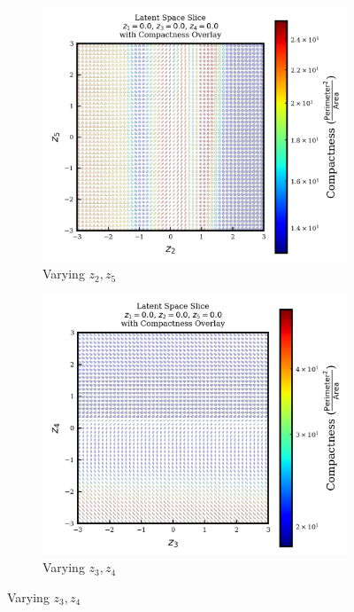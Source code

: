 \documentclass{article}
\begin{document}
\begin{figure}[H]
    \vspace{0.5em} %
    
    \begin{subfigure}{0.45\textwidth}
        \includegraphics[width=\linewidth]{figures/VAEmodels/model4/varying_z2_z5_fixed_z1=0.0_z3=0.0_z4=0.0.png}
        \caption{Varying $z_2, z_5$}
    \end{subfigure}
    \hfill
    \begin{subfigure}{0.45\textwidth}
        \includegraphics[width=\linewidth]{figures/VAEmodels/model4/varying_z3_z4_fixed_z1=0.0_z2=0.0_z5=0.0.png}
        \caption{Varying $z_3, z_4$}
    \end{subfigure}
    

\end{figure}
\end{document}
